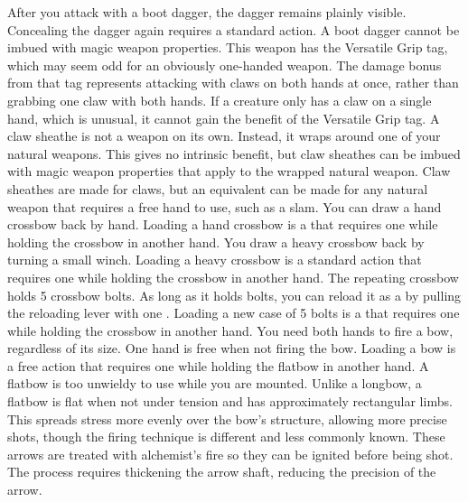         After you attack with a boot dagger, the dagger remains plainly visible.
        Concealing the dagger again requires a standard action.
        A boot dagger cannot be imbued with magic weapon properties.
         This weapon has the Versatile Grip tag, which may seem odd for an obviously one-handed weapon.
        The damage bonus from that tag represents attacking with claws on both hands at once, rather than grabbing one claw with both hands.
        If a creature only has a claw on a single hand, which is unusual, it cannot gain the benefit of the Versatile Grip tag.
         A claw sheathe is not a weapon on its own.
        Instead, it wraps around one of your natural weapons.
        This gives no intrinsic benefit, but claw sheathes can be imbued with magic weapon properties that apply to the wrapped natural weapon.
        Claw sheathes are made for claws, but an equivalent can be made for any natural weapon that requires a free hand to use, such as a slam.
         You can draw a hand crossbow back by hand. Loading a hand crossbow is a  that requires one  while holding the crossbow in another hand.
         You draw a heavy crossbow back by turning a small winch.
        Loading a heavy crossbow is a standard action that requires one  while holding the crossbow in another hand.
         The repeating crossbow holds 5 crossbow bolts. As long as it holds bolts, you can reload it as a  by pulling the reloading lever with one . Loading a new case of 5 bolts is a  that requires one  while holding the crossbow in another hand.
         You need both hands to fire a bow, regardless of its size. One hand is free when not firing the bow. Loading a bow is a free action that requires one  while holding the flatbow in another hand. A flatbow is too unwieldy to use while you are mounted.
        Unlike a longbow, a flatbow is flat when not under tension and has approximately rectangular limbs.
        This spreads stress more evenly over the bow's structure, allowing more precise shots, though the firing technique is different and less commonly known.
         These arrows are treated with alchemist's fire so they can be ignited before being shot.
        The process requires thickening the arrow shaft, reducing the precision of the arrow.
